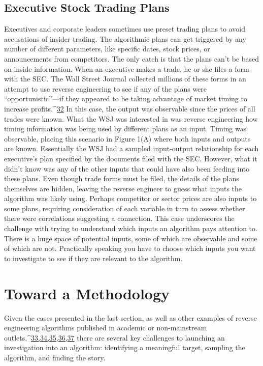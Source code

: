 \section{Executive Stock Trading Plans }
Executives and corporate leaders sometimes use preset trading plans to avoid accusations of insider trading. The algorithmic plans can get triggered by any number of different parameters, like specific dates, stock prices, or announcements from competitors. The only catch is that the plans can't be based on inside information. When an executive makes a trade, he or she files a form with the SEC. The Wall Street Journal collected millions of these forms in an attempt to use reverse engineering to see if any of the plans were ``opportunistic''—if they appeared to be taking advantage of market timing to increase profits.^{\href{#endnotes}{32}}
In this case, the output was observable since the prices of all trades were known. What the WSJ was interested in was reverse engineering how timing information was being used by different plans as an input. Timing was observable, placing this scenario in Figure 1(A) where both inputs and outputs are known. Essentially the WSJ had a sampled input-output relationship for each executive's plan specified by the documents filed with the SEC. However, what it didn't know was any of the other inputs that could have also been feeding into these plans. Even though trade forms must be filed, the details of the plans themselves are hidden, leaving the reverse engineer to guess what inputs the algorithm was likely using. Perhaps competitor or sector prices are also inputs to some plans, requiring consideration of each variable in turn to assess whether there were correlations suggesting a connection. This case underscores the challenge with trying to understand which inputs an algorithm pays attention to. There is a huge space of potential inputs, some of which are observable and some of which are not. Practically speaking you have to choose which inputs you want to investigate to see if they are relevant to the algorithm. 
\chapter{Toward a Methodology }
Given the cases presented in the last section, as well as other examples of reverse engineering algorithms published in academic or non-mainstream outlets,^{\href{#endnotes}{33,34,35,36,37}} there are several key challenges to launching an investigation into an algorithm: identifying a meaningful target, sampling the algorithm, and finding the story.
